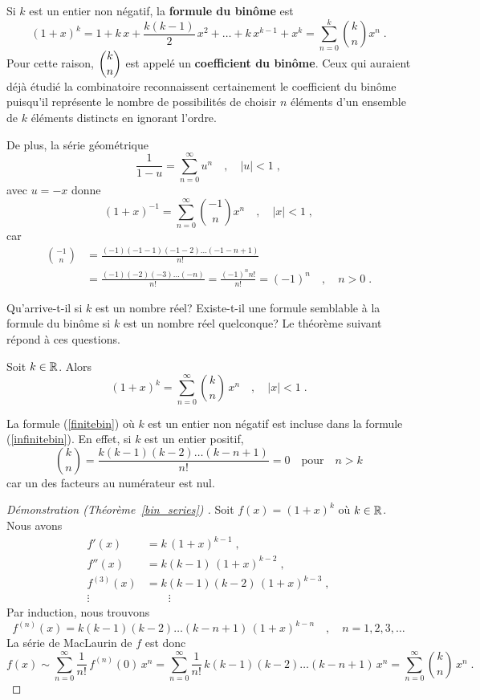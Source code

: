 {Si $k$ est un entier non négatif, la {\bfseries formule du binôme}
 est
\begin{equation}\label{finitebin}
(1+x)^k = 1 + k\,x + \frac{k(k-1)}{2}\,x^2 + \ldots + k\,x^{k-1} + x^k
= \sum_{n=0}^k \binom{k}{n} x^n \; .
\end{equation}
Pour cette raison, $\displaystyle \binom{k}{n}$ est appelé un
{\bfseries coefficient du binôme}.
Ceux qui auraient déjà étudié la combinatoire reconnaissent
certainement le coefficient du binôme puisqu'il représente le nombre
de possibilités de choisir $n$ éléments d'un ensemble de 
$k$ éléments distincts en ignorant l'ordre.

De plus, la série géométrique
\[
\frac{1}{1-u} = \sum_{n=0}^\infty u^n \quad , \quad |u|<1 \; ,
\]
avec $u=-x$ donne
\[
(1+x)^{-1} = \sum_{n=0}^\infty \binom{-1}{n} x^n \quad , \quad |x|<1\; ,
\]
car
\begin{align*}
\binom{-1}{n} &= \frac{(-1)(-1-1)(-1-2)\ldots(-1-n+1)}{n!} \\
&= \frac{(-1)(-2)(-3)\ldots(-n)}{n!} = \frac{(-1)^n n!}{n!} = (-1)^n
\quad , \quad n>0 \;.
\end{align*}

Qu'arrive-t-il si $k$ est un nombre réel?  Existe-t-il une formule semblable
à la formule du binôme si $k$ est un nombre réel quelconque?  Le théorème
suivant répond à ces questions.

\begin{theorem} \label{bin_series}
Soit $k\in \mathbb{R}$.  Alors
\begin{equation}\label{infinitebin}
(1+x)^k = \sum_{n=0}^\infty \binom{k}{n} \, x^n \quad , \quad |x|<1 \; .
\end{equation}
\end{theorem}

\begin{rmk}
La formule (\ref{finitebin}) où $k$ est un entier non négatif est
incluse dans la formule (\ref{infinitebin}).  En effet, si $k$ est un
entier positif,
\[
\binom{k}{n} = \frac{k(k-1)(k-2)\ldots(k-n+1)}{n!} = 0
\quad \text{pour} \quad n > k
\]
car un des facteurs au numérateur est nul.
\end{rmk}

\begin{proof}[Démonstration (Théorème~\ref{bin_series}) \theory]
Soit $f(x)=(1+x)^k$ où $k\in \mathbb{R}$.  Nous avons
\begin{align*}
f'(x) &= k\,(1+x)^{k-1} \; ,\\
f''(x) &= k(k-1)\,(1+x)^{k-2} \; , \\
f^{(3)}(x) &= k(k-1)(k-2)\,(1+x)^{k-3} \; , \\
\vdots & \qquad \vdots
\end{align*}
Par induction, nous trouvons
\[
f^{(n)}(x) = k(k-1)(k-2)\ldots(k-n+1)\,(1+x)^{k-n} \quad , \quad
n=1,2,3,\ldots
\]
La série de MacLaurin de $f$ est donc
\[
f(x) \sim \sum_{n=0}^\infty \frac{1}{n!}\,f^{(n)}(0)\, x^n
= \sum_{n=0}^\infty \frac{1}{n!}\,k(k-1)(k-2)\ldots(k-n+1)\, x^n
= \sum_{n=0}^\infty \binom{k}{n} \, x^n \; .
\]


\end{proof}}
